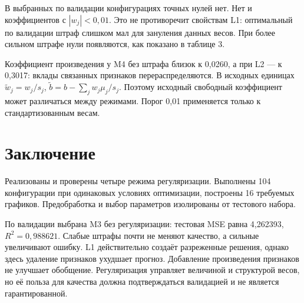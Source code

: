 В выбранных по валидации конфигурациях точных нулей нет. Нет и коэффициентов с $|w_j|<0{,}01$. Это не противоречит свойствам L1: оптимальный по валидации штраф слишком мал для зануления данных весов. При более сильном штрафе нули появляются, как показано в таблице 3.

Коэффициент произведения у M4 без штрафа близок к 0{,}0260, а при L2 --- к 0{,}3017: вклады связанных признаков перераспределяются. В исходных единицах $\tilde w_j=w_j/s_j$, $\tilde b=b-\sum_j w_j\mu_j/s_j$. Поэтому исходный свободный коэффициент может различаться между режимами. Порог 0{,}01 применяется только к стандартизованным весам.

\section{Заключение}
Реализованы и проверены четыре режима регуляризации. Выполнены 104 конфигурации при одинаковых условиях оптимизации, построены 16 требуемых графиков. Предобработка и выбор параметров изолированы от тестового набора.

По валидации выбрана M3 без регуляризации: тестовая MSE равна 4{,}262393, $R^2=0{,}988621$. Слабые штрафы почти не меняют качество, а сильные увеличивают ошибку. L1 действительно создаёт разреженные решения, однако здесь удаление признаков ухудшает прогноз. Добавление произведения признаков не улучшает обобщение. Регуляризация управляет величиной и структурой весов, но её польза для качества должна подтверждаться валидацией и не является гарантированной.
